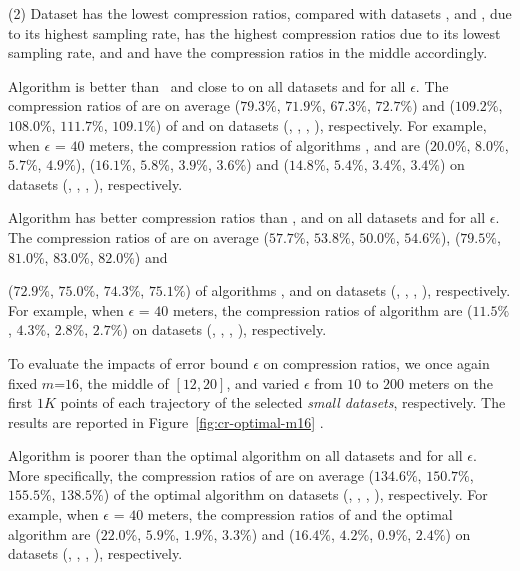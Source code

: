 {\ni (2) Dataset \pricar has the lowest compression ratios, compared with datasets \mopsi, \sercar and \geolife, due to its highest sampling rate,
\sercar has the highest compression ratios due to its lowest sampling rate, and \geolife and \mopsi have the compression ratios in the middle accordingly.

 Algorithm \cist is better than \squishe ~{and close to} \dps on all datasets and for all $\epsilon$.
The compression ratios of \cist are on average {($79.3\%$, $71.9\%$, $67.3\%$, $72.7\%$) and ($109.2\%$, $108.0\%$, $111.7\%$, $109.1\%$)} of \squishe and
\dps on {datasets (\sercar, \geolife, \mopsi, \pricar)}, respectively.
For example, when $\epsilon$ = $40$ meters, the compression ratios of algorithms
\squishe, \cist and \dps are
{($20.0\%$, $8.0\%$, $5.7\%$, $4.9\%$), ($16.1\%$, $5.8\%$, $3.9\%$, $3.6\%$) and ($14.8\%$, $5.4\%$, $3.4\%$, $3.4\%$)} on  {datasets (\sercar, \geolife, \mopsi, \pricar)}, respectively.

 Algorithm \cista has better compression ratios than \dpa, \squishe and \cist on all datasets and for all $\epsilon$.
The compression ratios of \cista are on average ($57.7\%$, $53.8\%$, $50.0\%$, $54.6\%$), ($79.5\%$, $81.0\%$, $83.0\%$, $82.0\%$) and {($72.9\%$, $75.0\%$, $74.3\%$, $75.1\%$) of algorithms
\squishe, \dps and \cist on {datasets (\sercar, \geolife, \mopsi, \pricar)}, respectively.
For example, when $\epsilon$ = $40$ meters, the compression ratios of algorithm
\cista are ($11.5\%$, $4.3\%$, $2.8\%$, $2.7\%$) on datasets (\sercar, \geolife, \mopsi, \pricar), respectively.

To evaluate the impacts of error bound $\epsilon$ on compression ratios, we once again fixed {$m$=$16$}, the middle of $[12, 20]$, and varied $\epsilon$ from $10$ to $200$ meters on the first $1K$ points of each trajectory of the selected \textit{small datasets}, respectively.
The results are reported in Figure~\ref{fig:cr-optimal-m16} .

 Algorithm \cist is poorer than the optimal algorithm on all datasets and for all $\epsilon$.
More specifically, the compression ratios of \cist are on average ($134.6\%$, $150.7\%$, $155.5\%$, $138.5\%$) of the optimal algorithm on {datasets (\sercar, \geolife, \mopsi, \pricar)}, respectively.
For example, when $\epsilon$ = $40$ meters, the compression ratios of \cist and the optimal algorithm are
($22.0\%$, $5.9\%$, $1.9\%$, $3.3\%$) and {($16.4\%$, $4.2\%$, $0.9\%$, $2.4\%$)}
on  {datasets (\sercar, \geolife, \mopsi, \pricar)}, respectively.

}}
